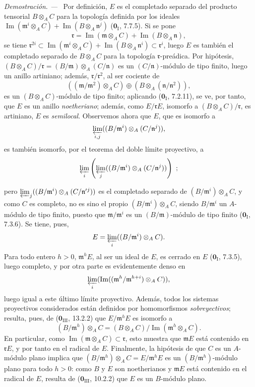 \documentclass[10pt,oneside]{book}
\newcommand{\oldpage}[2][]{%
  \setcounter{footnote}{0}%
  \marginpar{\scriptsize\textbf{#1}~|~#2}\ignorespaces}
\newenvironment{proof}{%
  \par\medskip\noindent\textit{Demostración. ---\ }}{\par}
\begin{document}
\begin{proof}
Por definición, $E$ es el completado separado del producto tensorial $B\otimes_A C$
para la topología definida por los ideales
$\operatorname{Im}(\mathfrak m^i\otimes_A C)+
\operatorname{Im}(B\otimes_A\mathfrak n^j)$
($\mathbf 0_{\mathrm I}$, 7.7.5). Si se pone
\[
  \mathfrak r=\operatorname{Im}(\mathfrak m\otimes_A C)+
  \operatorname{Im}(B\otimes_A\mathfrak n),
\]
se tiene
$\mathfrak r^{2i}\subset
\operatorname{Im}(\mathfrak m^i\otimes_A C)+
\operatorname{Im}(B\otimes_A\mathfrak n^i)\subset\mathfrak r^i$, luego $E$
es también el completado separado de $B\otimes_A C$ para la topología
$\mathfrak r$-preádica. Por hipótesis,
$(B\otimes_A C)/\mathfrak r=(B/\mathfrak m)\otimes_A(C/\mathfrak n)$ es un
$(C/\mathfrak n)$-módulo de tipo finito, luego un anillo artiniano; además,
$\mathfrak r/\mathfrak r^2$, al ser cociente de
\[
  ((\mathfrak m/\mathfrak m^2)\otimes_A C)
  \oplus(B\otimes_A(\mathfrak n/\mathfrak n^2)),
\]
es un $(B\otimes_A C)$-módulo de tipo finito; aplicando
($\mathbf 0_{\mathrm I}$, 7.2.11), se ve, por tanto, que $E$ es un anillo
\emph{noetheriano}; además, como $E/\mathfrak rE$, isomorfo a
$(B\otimes_A C)/\mathfrak r$, es artiniano, $E$ es \emph{semilocal}.
Observemos ahora que $E$, que es isomorfo a
\[
  \varprojlim_{i,j}((B/\mathfrak m^i)\otimes_A(C/\mathfrak n^j)),
\]
es también isomorfo, por el teorema del doble límite proyectivo, a
\[
  \varprojlim_i\left(\varprojlim_j
  ((B/\mathfrak m^i)\otimes_A(C/\mathfrak n^j))\right)~;
\]

\oldpage[0\textsubscript{IV-1}]{106}

pero $\varprojlim_j((B/\mathfrak m^i)\otimes_A(C/\mathfrak n'{}^j))$ es el
completado separado de $(B/\mathfrak m^i)\otimes_A C$, y como $C$ es completo,
no es sino el propio $(B/\mathfrak m^i)\otimes_A C$,
siendo $B/\mathfrak m^i$ un $A$-módulo de tipo finito, puesto que
$\mathfrak m/\mathfrak m^i$ es un $(B/\mathfrak m)$-módulo de tipo finito
($\mathbf 0_{\mathrm I}$, 7.3.6). Se tiene, pues,
\[
  E=\varprojlim_i((B/\mathfrak m^i)\otimes_A C).
\]
Para todo entero $h>0$, $\mathfrak m^hE$, al ser un ideal de $E$, es cerrado
en $E$ ($\mathbf 0_{\mathrm I}$, 7.3.5), luego completo, y por otra parte es
evidentemente denso en
\[
  \varprojlim_i
  (\operatorname{Im}((\mathfrak m^h/\mathfrak m^{h+i})\otimes_A C)),
\]
luego igual a este último límite proyectivo. Además, todos los sistemas
proyectivos considerados están definidos por homomorfismos \emph{sobreyectivos};
resulta, pues, de ($\mathbf 0_{\mathrm{III}}$, 13.2.2) que
$E/\mathfrak m^hE$ es isomorfo a
\[
  (B/\mathfrak m^h)\otimes_A C
  =(B\otimes_A C)/\operatorname{Im}(\mathfrak m^h\otimes_A C).
\]
En particular, como
$\operatorname{Im}(\mathfrak m\otimes_A C)\subset\mathfrak r$, esto muestra
que $\mathfrak mE$ está contenido en $\mathfrak rE$, y por tanto en el radical de
$E$. Finalmente, la hipótesis de que $C$ es un $A$-módulo plano implica que
$(B/\mathfrak m^h)\otimes_A C=E/\mathfrak m^hE$ es un
$(B/\mathfrak m^h)$-módulo plano para todo $h>0$: como $B$ y $E$ son
noetherianos y $\mathfrak mE$ está contenido en el radical de $E$,
resulta de ($\mathbf 0_{\mathrm{III}}$, 10.2.2) que $E$ es un $B$-módulo
plano.
\end{proof}
\end{document}
